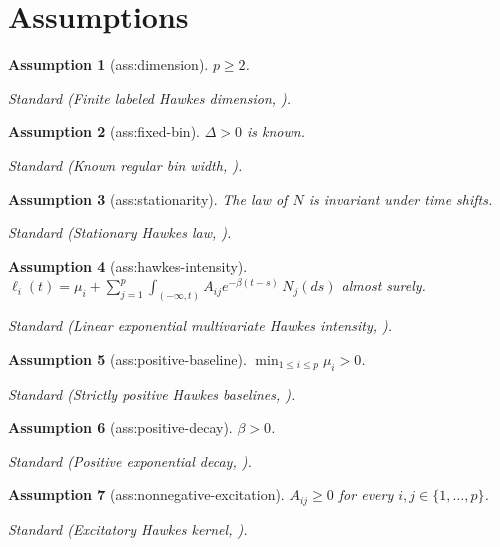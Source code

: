 \documentclass{article}
\newtheorem{assumption}{Assumption}
\begin{document}
\section{Assumptions}

\begin{assumption}[ass:dimension]\label{ass:dimension}
\(p\geq2\).
\par\smallskip\noindent\emph{Standard} (Finite labeled Hawkes dimension, \cite{BacryMuzy2016}).
\end{assumption}

\begin{assumption}[ass:fixed-bin]\label{ass:fixed-bin}
\(\Delta>0\) is known.
\par\smallskip\noindent\emph{Standard} (Known regular bin width, \cite{CheyssonLang2022}).
\end{assumption}

\begin{assumption}[ass:stationarity]\label{ass:stationarity}
The law of \(N\) is invariant under time shifts.
\par\smallskip\noindent\emph{Standard} (Stationary Hawkes law, \cite{Hawkes1971Spectra}).
\end{assumption}

\begin{assumption}[ass:hawkes-intensity]\label{ass:hawkes-intensity}
\(\ell_i(t)=\mu_i+\sum_{j=1}^p\int_{(-\infty,t)}A_{ij}e^{-\beta(t-s)}\,N_j(ds)\) almost surely.
\par\smallskip\noindent\emph{Standard} (Linear exponential multivariate Hawkes intensity, \cite{EtesamiZhangSinghalKiyavash2016}).
\end{assumption}

\begin{assumption}[ass:positive-baseline]\label{ass:positive-baseline}
\(\min_{1\leq i\leq p}\mu_i>0\).
\par\smallskip\noindent\emph{Standard} (Strictly positive Hawkes baselines, \cite{BacryMuzy2016}).
\end{assumption}

\begin{assumption}[ass:positive-decay]\label{ass:positive-decay}
\(\beta>0\).
\par\smallskip\noindent\emph{Standard} (Positive exponential decay, \cite{EtesamiZhangSinghalKiyavash2016}).
\end{assumption}

\begin{assumption}[ass:nonnegative-excitation]\label{ass:nonnegative-excitation}
\(A_{ij}\geq0\) for every \(i,j\in\{1,\ldots,p\}\).
\par\smallskip\noindent\emph{Standard} (Excitatory Hawkes kernel, \cite{Hawkes1971Spectra}).
\end{assumption}
\end{document}
